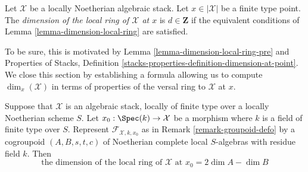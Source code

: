 \begin{definition}
\label{definition-dimension-local-ring}
Let $\mathcal{X}$ be a locally Noetherian algebraic stack.
Let $x \in |\mathcal{X}|$ be a finite type point.
The {\it dimension of the local ring of $\mathcal{X}$ at $x$}
is $d \in \mathbf{Z}$ if the equivalent conditions of
Lemma \ref{lemma-dimension-local-ring} are satisfied.
\end{definition}

\noindent
To be sure, this is motivated by Lemma \ref{lemma-dimension-local-ring-pre}
and Properties of Stacks, Definition
\ref{stacks-properties-definition-dimension-at-point}.
We close this section by establishing a formula allowing us to
compute $\dim_x(\mathcal{X})$ in terms of properties of the versal ring
to $\mathcal{X}$ at $x$.

\begin{lemma}
\label{lemma-dimension-formula}
Suppose that $\mathcal{X}$ is an algebraic stack, locally of finite type
over a locally Noetherian scheme $S$. Let $x_0 : \Spec(k) \to \mathcal{X}$
be a morphism where $k$ is a field of finite type over $S$. Represent
$\mathcal{F}_{\mathcal{X}, k, x_0}$ as in Remark \ref{remark-groupoid-defo}
by a cogroupoid $(A, B, s, t, c)$ of Noetherian complete local $S$-algebras
with residue field $k$. Then
$$
\text{the dimension of the local ring of }\mathcal{X}\text{ at }x_0 =
2\dim A - \dim B
$$
\end{lemma}

